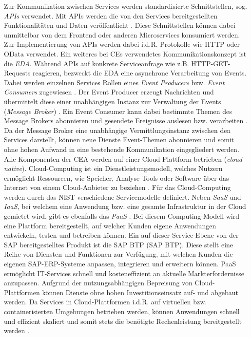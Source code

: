 Zur Kommunikation zwischen Services werden standardisierte Schnittstellen, sog. \textit{\ac*{APIs}} verwendet. Mit APIs werden die von den Services bereitgestellten Funktionalitäten und Daten veröffentlicht \cite[15]{Biehl.2015}. Diese Schnittstellen können dabei unmittelbar von dem Frontend oder anderen Microservices konsumiert werden. Zur Implementierung von APIs werden dabei i.d.R. Protokolle wie HTTP oder OData verwendet. Ein weiteres bei CEs verwendetes Kommunikationskonzept ist die \textit{\ac{EDA}}. Während APIs auf konkrete Serviceanfrage wie z.B. HTTP-GET-Requests reagieren, bezweckt die \acs{EDA} eine asynchrone Verarbeitung von Events. Dabei werden einzelnen Services Rollen eines \textit{Event Producers} bzw. \textit{Event Consumers} zugewiesen \cite[51]{Bruns.2010}. Der Event Producer erzeugt Nachrichten und übermittelt diese einer unabhängigen Instanz zur Verwaltung der Events (\textit{Message Broker}) \cite[61]{Bruns.2010}. Ein Event Consumer kann dabei bestimmte Themen des Message Brokers abonnieren und  gesendete Ereignisse auslesen bzw. verarbeiten \cite[54]{Bruns.2010}. Da der Message Broker eine unabhängige Vermittlungsinstanz zwischen den Services darstellt, können neue Dienste Event-Themen abonnieren und somit ohne hohen Aufwand in eine bestehende Kommunikation eingegliedert werden. Alle Komponenten der CEA werden auf einer Cloud-Plattform betrieben (\textit{cloud-native}). Cloud-Computing ist ein Dienstleistungsmodell, welches Nutzern ermöglicht Ressourcen, wie Speicher, Analyse-Tools oder Software über das Internet von einem Cloud-Anbieter zu beziehen \cite[5]{Reinheimer.2018}. Für das Cloud-Computing werden durch das \ac{NIST} verschiedene Servicemodelle definiert. Neben \textit{\ac{SaaS}} und \textit{\ac{IaaS}}, bei welchem  eine Anwendung bzw. eine gesamte Infrastruktur in der Cloud gemietet wird, gibt es ebenfalls das \textit{\ac{PaaS}} \cite{Reinheimer.2018} \cite[9]{Reinheimer.2018}. Bei diesem Computing-Modell wird eine Plattform bereitgestellt, auf welcher Kunden eigene Anwendungen entwickeln, testen und betreiben können. Ein auf dieser Service-Ebene von der SAP bereitgestelltes Produkt ist die SAP \acl{BTP} (SAP \acs{BTP}). Diese stellt eine Reihe von Diensten und Funktionen zur Verfügung, mit welchen Kunden die eigenen SAP-ERP-Systeme anpassen, integrieren und erweitern können. PaaS ermöglicht IT-Services schnell und kosteneffizient an aktuelle Markterfordernisse anzupassen. Aufgrund der nutzungsabhängigen Bepreisung von Cloud-Plattformen können Dienste ohne hohen Investitionseinsatz auf- und abgebaut werden. Da Services in Cloud-Plattformen i.d.R. auf virtuellen bzw. containerisierten Umgebungen betrieben werden, können Anwendungen schnell und effizient skaliert und somit stets die benötigte Rechenleistung bereitgestellt werden \cite[10]{Reinheimer.2018}. 

